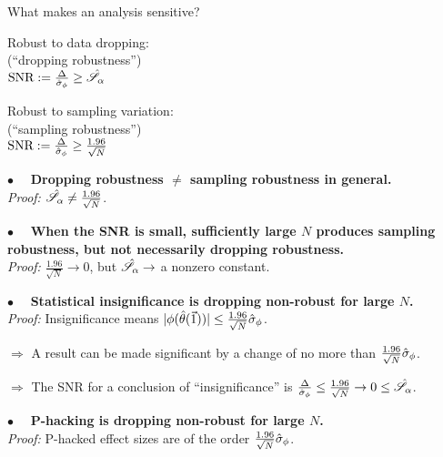 
\begin{frame}[t]{What makes an analysis sensitive?}
%
\begin{minipage}{0.45\textwidth}
\begin{center}
    Robust to data dropping:\\
    (``dropping robustness'')\\
    \vspace{1em}
    $\textrm{SNR} := \frac{\Delta}{\hat\sigma_{\phi}} \ge \hat{\mathscr{S}}_\alpha$
\end{center}
\end{minipage}
%
\begin{minipage}{0.45\textwidth}
\begin{center}
    Robust to sampling variation:\\
    (``sampling robustness'')\\
    \vspace{1em}
    $\textrm{SNR} := \frac{\Delta}{\hat\sigma_{\phi}} \ge
        \frac{1.96}{\sqrt{N}}$
\end{center}
\end{minipage}

\vspace{1em}

\hrulefill

\pause
\vspace{0.5em} $\bullet\quad$
\textbf{Dropping robustness $\ne$ sampling robustness in general.\\}
\textit{Proof: }
$\hat{\mathscr{S}}_\alpha \ne \frac{1.96}{\sqrt{N}}$.

\pause
\vspace{0.5em} $\bullet\quad$
\textbf{When the SNR is small, sufficiently large $N$
produces sampling robustness, but not necessarily
dropping robustness.\\}
\textit{Proof: }
$\frac{1.96}{\sqrt{N}} \rightarrow 0$, but $\hat{\mathscr{S}}_\alpha \rightarrow$ a nonzero
constant.

\pause
\vspace{0.5em} $\bullet\quad$
\textbf{Statistical insignificance is dropping non-robust for large $N$.\\}
\textit{Proof: }
%
Insignificance means
$|\phi(\hat{\theta}(\vec{1}))| \le \frac{1.96}{\sqrt{N}} \hat\sigma_{\phi}$.

$\Rightarrow$ A result can be made significant by a change of no more than
$\frac{1.96}{\sqrt{N}} \hat\sigma_{\phi}$.

$\Rightarrow$ The SNR for a conclusion
of ``insignificance'' is $\frac{\Delta}{\hat\sigma_{\phi}} \le \frac{1.96}{\sqrt{N}}
\rightarrow 0 \le \hat{\mathscr{S}}_\alpha$.

\pause
\vspace{0.5em} $\bullet\quad$
\textbf{P-hacking is dropping non-robust for large $N$.\\}
\textit{Proof: }P-hacked effect sizes are of the order
$\frac{1.96}{\sqrt{N}} \hat\sigma_{\phi}$.

\end{frame}



